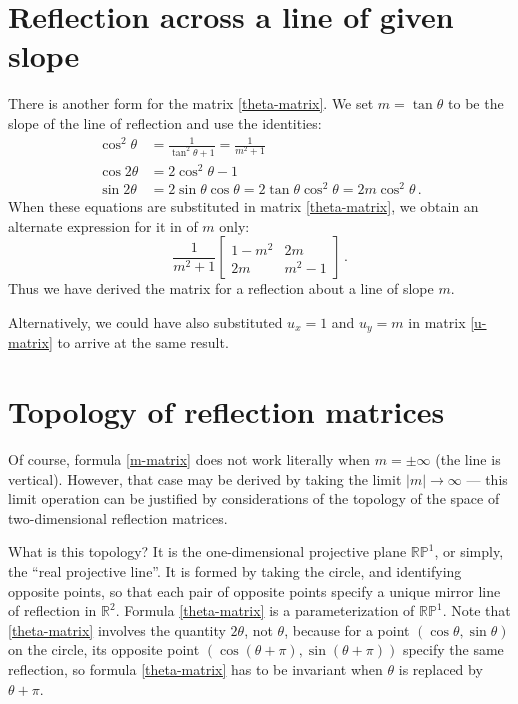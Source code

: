 \documentclass[12pt]{article}
\newcommand{\real}{\mathbb{R}}
\providecommand{\abs}[1]{\lvert#1\rvert}
\newcommand{\RPone}{\mathbb{RP}^1}
\begin{document}
\section*{Reflection across a line of given slope}
There is another form for the matrix \eqref{theta-matrix}.
We set $m = \tan \theta$ to be the slope of the line of reflection
and use the identities:
\begin{align*}
\cos^2 \theta &= \frac{1}{\tan^2 \theta + 1}  = \frac{1}{m^2 + 1} \\
\cos 2 \theta &= 2 \cos^2 \theta - 1  \\
\sin 2 \theta &= 2 \sin \theta \cos \theta = 2 \tan \theta \cos^2 \theta = 2m \cos^2 \theta\,.
\end{align*}
When these equations are substituted in matrix \eqref{theta-matrix},
we obtain an alternate expression for it in  of $m$ only:
\begin{equation}\label{m-matrix}
\frac{1}{m^2 + 1} 
\begin{bmatrix}
1-m^2 & 2m \\
2m & m^2 - 1
\end{bmatrix}\,.
\end{equation}
Thus we have derived the matrix for a reflection about a line of slope $m$.

Alternatively, we could have also substituted $u_x = 1$ and $u_y = m$
in matrix \eqref{u-matrix} to arrive at the same result.

\section*{Topology of reflection matrices}
Of course, formula \eqref{m-matrix} does not work literally when 
$m = \pm \infty$ (the line is vertical).
However, that case may be derived by taking the limit $\abs{m} \to \infty$ ---
this limit operation can be justified by considerations of the topology of 
the space of two-dimensional reflection matrices.

What is this topology? It is the one-dimensional projective plane $\RPone$,
or simply, the ``real projective line''.
It is formed by taking the circle, and identifying opposite points, so
that each pair of opposite points specify a unique mirror line of reflection in $\real^2$.
Formula \eqref{theta-matrix} is a parameterization of $\RPone$.
Note that \eqref{theta-matrix} involves the quantity $2\theta$, not $\theta$,
because for a point $(\cos \theta, \sin \theta)$ on the circle,
its opposite point $(\cos (\theta+\pi), \sin (\theta+\pi))$ specify the same reflection,
so formula \eqref{theta-matrix} has to be invariant when $\theta$ is replaced by $\theta + \pi$.
\end{document}
